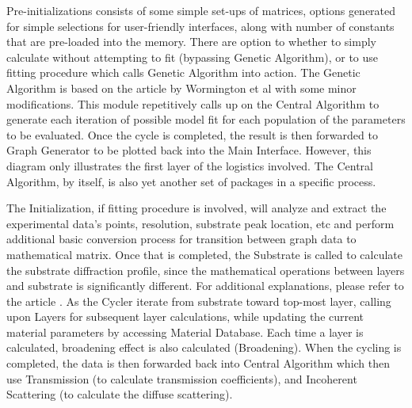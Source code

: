 Pre-initializations consists of some simple set-ups of matrices, options generated for simple selections for user-friendly interfaces, along with number of constants that are pre-loaded into the memory.  There are option to whether to simply calculate without attempting to fit (bypassing Genetic Algorithm), or to use fitting procedure which calls Genetic Algorithm into action.  The Genetic Algorithm is based on the article by Wormington et al \cite{Wormington1}with some minor modifications.  This module repetitively calls up on the Central Algorithm to generate each iteration of possible model fit for each population of the parameters to be evaluated.  Once the cycle is completed, the result is then forwarded to Graph Generator to be plotted back into the Main Interface.  However, this diagram only illustrates the first layer of the logistics involved.  The Central Algorithm, by itself, is also yet another set of packages in a specific process.


The Initialization, if fitting procedure is involved, will analyze and extract the experimental data's points, resolution, substrate peak location, etc and perform additional basic conversion process for transition between graph data to mathematical matrix.  Once that is completed, the Substrate is called to calculate the substrate diffraction profile, since the mathematical  operations between layers and substrate is significantly different.  For additional explanations, please refer to the article \cite{Shreeman1}.  As the Cycler iterate from substrate toward top-most layer, calling upon Layers for subsequent layer calculations, while updating the current material parameters by accessing Material Database.  Each time a layer is calculated, broadening effect is also calculated (Broadening).  When the cycling is completed, the data is then forwarded back into Central Algorithm which then use Transmission (to calculate transmission coefficients), and Incoherent Scattering (to calculate the diffuse scattering).

